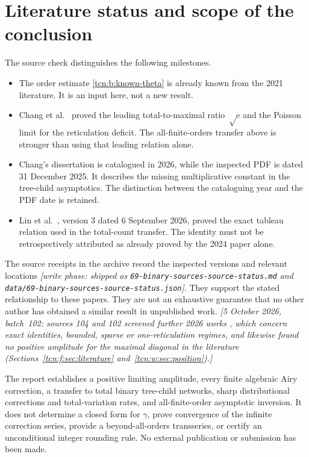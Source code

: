 \documentclass[11pt,letterpaper]{article}
\newcommand{\ee}{\mathrm e}
\theoremstyle{remark}
\begin{document}
\section{Literature status and scope of the conclusion}\label{tcn:b:sec:literature}
The source check distinguishes the following milestones.
\begin{itemize}
 \item The order estimate \eqref{tcn:b:known-theta} is already known from the 2021 literature. It is an input here, not a new result.
 \item Chang et al.\ \cite{Chang2024} proved the leading total-to-maximal ratio $\sqrt\ee$ and the Poisson limit for the reticulation deficit. The all-finite-orders transfer above is stronger than using that leading relation alone.
 \item Chang's dissertation \cite{ChangThesis} is catalogued in 2026, while the inspected PDF is dated 31 December 2025. It describes the missing multiplicative constant in the tree-child asymptotics. The distinction between the cataloguing year and the PDF date is retained.
 \item Lin et al.\ \cite{LL2026}, version 3 dated 6 September 2026, proved the exact tableau relation used in the total-count transfer. The identity must not be retrospectively attributed as already proved by the 2024 paper alone.
\end{itemize}
The source receipts in the archive record the inspected versions and relevant locations \emph{[write phase: shipped as \textup{\nolinkurl{69-binary-sources-source-status.md}} and \textup{\nolinkurl{data/69-binary-sources-source-status.json}}]}. They support the stated relationship to these papers. They are not an exhaustive guarantee that no other author has obtained a similar result in unpublished work.
\emph{[5 October 2026, batch~102: sources 104 and 102 screened further 2026 works \cite{LWY2026,YZ2026,FY2026,YZ2026short,Liu2026,EFLW2026}, which concern exact identities, bounded, sparse or one-reticulation regimes, and likewise found no positive amplitude for the maximal diagonal in the literature (Sections~\ref{tcn:f:sec:literature} and~\ref{tcn:w:sec:position}).]}

The report establishes a positive limiting amplitude, every finite algebraic Airy correction, a transfer to total binary tree-child networks, sharp distributional corrections and total-variation rates, and all-finite-order asymptotic inversion. It does not determine a closed form for $\gamma$, prove convergence of the infinite correction series, provide a beyond-all-orders transseries, or certify an unconditional integer rounding rule. No external publication or submission has been made.
\end{document}
